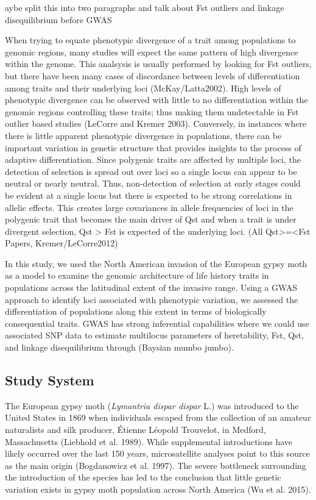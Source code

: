 \documentclass[fleqn,11pt]{wlpeerj}
\begin{document}
^^Maybe split this into two paragraphs and talk about Fst outliers and linkage disequilibrium before GWAS

When trying to equate phenotypic divergence of a trait among populations to genomic regions, many studies will expect the same pattern of high divergence within the genome. This analsysis is usually performed by looking for Fst outliers, but there have been many cases of discordance between levels of differentiation among traits and their underlying loci (McKay/Latta2002).  High levels of phenotypic divergence can be observed with little to no differentiation within the genomic regions controlling these traits; thus making them undetectable in Fst outlier based studies (LeCorre and Kremer 2003).  Conversely, in instances where there is little apparent phenotypic divergence in populations, there can be important variation in genetic structure that provides insights to the process of adaptive differentiation. Since polygenic traits are affected by multiple loci, the detection of selection is spread out over loci so a single locus can appear to be neutral or nearly neutral. Thus, non-detection of selection at early stages could be evident at a single locus but there is expected to be strong correlations in allelic effects. This creates large covariances in allele frequencies of loci in the polygenic trait that becomes the main driver of Qst and when a trait is under divergent selection, Qst > Fst is expected of the underlying loci. (All Qst>=<Fst Papers, Kremer/LeCorre2012)

In this study, we used the North American invasion of the European gypsy moth as a model to examine the genomic architecture of life history traits in populations across the latitudinal extent of the invasive range.  Using a GWAS approach to identify loci associated with phenotypic variation, we assessed the differentiation of populations along this extent in terms of biologically consequential traits. GWAS has strong inferential capabilities where we could use associated SNP data to estimate multilocus parameters of heretability, Fst, Qst, and linkage disequilibrium through (Baysian mumbo jumbo).

\subsection*{Study System}

The European gypsy moth (\textit{Lymantria dispar dispar} L.) was introduced to the United States in 1869 when individuals escaped from the collection of an amateur naturalists and silk producer, Étienne Léopold Trouvelot, in Medford, Massachusetts (Liebhold et al. 1989). While supplemental introductions have likely occurred over the last 150 years, microsatellite analyses point to this source as the main origin (Bogdanowicz et al. 1997). The severe bottleneck surrounding the introduction of the species has led to the conclusion that little genetic variation exists in gypsy moth population across North America (Wu et al. 2015). 
\end{document}

